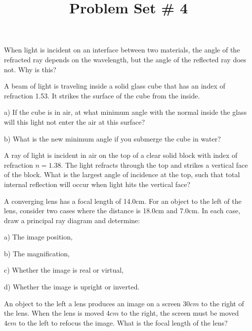 \documentclass[10pt]{article}
\newenvironment{problem}[2][Problem]{\begin{trivlist}
\item[\hskip \labelsep {\bfseries #1}\hskip \labelsep {\bfseries #2.}]}{\end{trivlist}}
\begin{document}
 \title{Problem Set \# 4}
\date{}
\maketitle

\begin{problem}{1}
When light is incident on an interface between two materials, the angle of the refracted ray depends on the wavelength, but the angle of the reflected ray does not. Why is this?
\end{problem}


 \begin{problem}{2}
A beam of light is traveling inside a solid glass cube that has an index of refraction 1.53. It strikes the surface of the cube from the inside.
\item a) If the cube is in air, at what minimum angle with the normal inside the glass will this light not enter the air at this surface?
\item b) What is the new minimum angle if you submerge the cube in water?
\end{problem}


\begin{problem}{3}
A ray of light is incident in air on the top of a clear solid block with index of refraction $n=1.38$. The light refracts through the top and strikes a vertical face of the block. What is the largest angle of incidence at the top, such that total internal reflection will occur when light hits the vertical face?
\end{problem}

\begin{problem}{4}
A converging lens has a focal length of 14.0cm. For an object to the left of the lens, consider two cases where the distance is 18.0cm and 7.0cm. In each case, draw a principal ray diagram and determine:
\item a) The image position,
\item b) The magnification,
\item c) Whether the image is real or virtual,
\item d) Whether the image is upright or inverted.
\end{problem}

\begin{problem}{5}
An object to the left a lens produces an image on a screen $30cm$ to the right of the lens. When the lens is moved $4cm$ to the right, the screen must be moved $4cm$ to the left to refocus the image. What is the focal length of the lens?
\end{problem}
\end{document}
